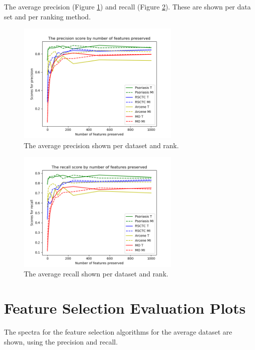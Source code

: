 \documentclass[10pt,a4paper]{report}
\begin{document}
	The average precision (Figure \ref{fig:DatasetRankPrecisionScores}) and recall (Figure \ref{fig:DatasetRankRecallScores}). These are shown per data set and per ranking method.
	
	\begin{figure}[H]
		\includegraphics[width=0.7\textwidth]{Data_Rank_Prec_Scores.png}
		\caption{The average precision shown per dataset and rank.}
		\label{fig:DatasetRankPrecisionScores}
	\end{figure}
	
	\begin{figure}[H]
		\includegraphics[width=0.7\textwidth]{Data_Rank_Rec_Scores.png}
		\caption{The average recall shown per dataset and rank.}
		\label{fig:DatasetRankRecallScores}
	\end{figure}
	
	\section{Feature Selection Evaluation Plots}
	\label{app:EvaluationPlots}
	
	The spectra for the feature selection algorithms for the average dataset are shown, using the precision and recall.
	
\end{document}
